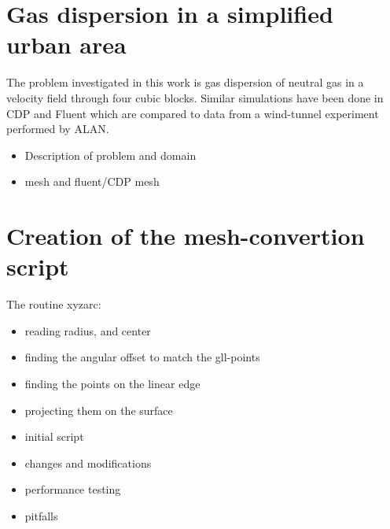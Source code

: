 \section{Gas dispersion in a simplified urban area}
The problem investigated in this work is gas dispersion of neutral gas in a velocity field through four cubic blocks.
Similar simulations have been done in CDP and Fluent which are compared to data from a wind-tunnel experiment performed by ALAN.
\begin{itemize}
	\item Description of problem and domain
	\item mesh and fluent/CDP mesh
\end{itemize}

\section{Creation of the mesh-convertion script}
The routine xyzarc:

\begin{itemize}
		\item reading radius, and center
		\item finding the angular offset to match the gll-points
		\item finding the points on the linear edge
		\item projecting them on the surface
\end{itemize}
\begin{itemize}
	\item initial script
	\item changes and modifications
	\item performance testing
	\item pitfalls
\end{itemize}

